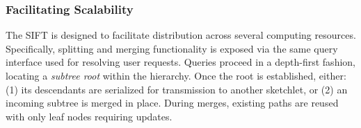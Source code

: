 \subsubsection{Facilitating Scalability}
The SIFT is designed to facilitate distribution across several computing resources. Specifically, splitting and merging functionality is exposed via the same query interface used for resolving user requests. Queries proceed in a depth-first fashion, locating a \emph{subtree root} within the hierarchy. Once the root is established, either: (1) its descendants are serialized for transmission to another sketchlet, or (2) an incoming subtree is merged in place. During merges, existing paths are reused with only leaf nodes requiring updates.
